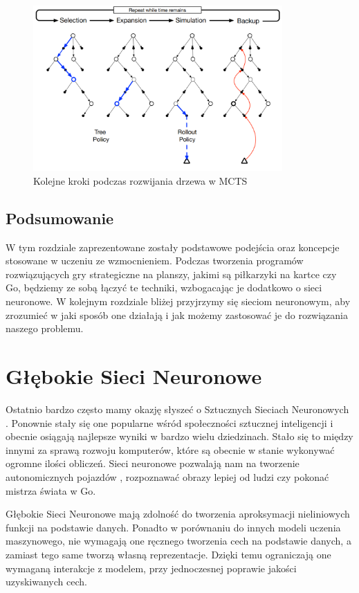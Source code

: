 \documentclass[licencjacka]{pracamgr}
\begin{document}
\begin{figure}[ht!]
  \centering
  \includegraphics[width=0.85\textwidth]{mcts}
  \caption{Kolejne kroki podczas rozwijania drzewa w MCTS}
\end{figure}


\section{Podsumowanie}

W tym rozdziale zaprezentowane zostały podstawowe podejścia oraz koncepcje stosowane w uczeniu ze wzmocnieniem. Podczas tworzenia programów rozwiązujących gry strategiczne na planszy, jakimi są piłkarzyki na kartce czy Go, będziemy ze sobą łączyć te techniki, wzbogacając je dodatkowo o sieci neuronowe. W kolejnym rozdziale bliżej przyjrzymy się sieciom neuronowym, aby zrozumieć w jaki sposób one działają i jak możemy zastosować je do rozwiązania naszego problemu.

\chapter{Głębokie Sieci Neuronowe}

Ostatnio bardzo często mamy okazję słyszeć o Sztucznych Sieciach Neuronowych \cite{dlbook}. Ponownie stały się one popularne wśród społeczności sztucznej inteligencji i obecnie osiągają najlepsze wyniki w bardzo wielu dziedzinach. Stało się to między innymi za sprawą rozwoju komputerów, które są obecnie w stanie wykonywać ogromne ilości obliczeń. Sieci neuronowe pozwalają nam na tworzenie autonomicznych pojazdów \cite{sdc1, sdc2}, rozpoznawać obrazy lepiej od ludzi \cite{resnet, resnext} czy pokonać mistrza świata w Go\cite{alphago2016, alphagozero}. 

Głębokie Sieci Neuronowe mają zdolność do tworzenia aproksymacji nieliniowych funkcji na podstawie danych. Ponadto w porównaniu do innych modeli uczenia maszynowego, nie wymagają one ręcznego tworzenia cech na podstawie danych, a zamiast tego same tworzą własną reprezentacje. Dzięki temu ograniczają one wymaganą interakcje z modelem, przy jednoczesnej poprawie jakości uzyskiwanych cech.
\end{document}
